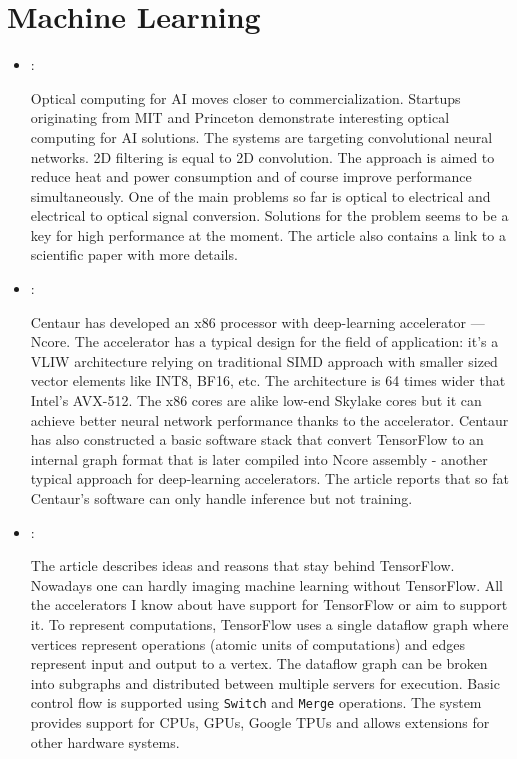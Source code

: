 \section*{Machine Learning}
\begin{itemize}
    \item \cite{Wheeler:Optical-AI:2019}:

    Optical computing for AI moves closer to commercialization. Startups originating from MIT and Princeton demonstrate interesting optical computing for AI solutions. The systems are targeting convolutional neural networks. 2D filtering is equal to 2D convolution. The approach is aimed to reduce heat and power consumption and of course improve performance simultaneously. One of the main problems so far is optical to electrical and electrical to optical signal conversion. Solutions for the problem seems to be a key for high performance at the moment. The article also contains a link to a scientific paper with more details.

    \item \cite{Gwennap:Centaur-AI:2019}:

    Centaur has developed an x86 processor with deep-learning accelerator --- Ncore. The accelerator has a typical design for the field of application: it's a VLIW architecture relying on traditional SIMD approach with smaller sized vector elements like INT8, BF16, etc. The architecture is 64 times wider that Intel's AVX-512. The x86 cores are alike low-end Skylake cores but it can achieve better neural network performance thanks to the accelerator. Centaur has also constructed a basic software stack that convert TensorFlow to an internal graph format that is later compiled into Ncore assembly - another typical approach for deep-learning accelerators. The article reports that so fat Centaur's software can only handle inference but not training.

    \item \cite{Abadi:TensorFlow:2016}:

    The article describes ideas and reasons that stay behind TensorFlow. Nowadays one can hardly imaging machine learning without TensorFlow. All the accelerators I know about have support for TensorFlow or aim to support it. To represent computations, TensorFlow uses a single dataflow graph where vertices represent operations (atomic units of computations) and edges represent input and output to a vertex. The dataflow graph can be broken into subgraphs and distributed between multiple servers for execution. Basic control flow is supported using \texttt{Switch} and \texttt{Merge} operations. The system provides support for CPUs, GPUs, Google TPUs and allows extensions for other hardware systems.
\end{itemize}

